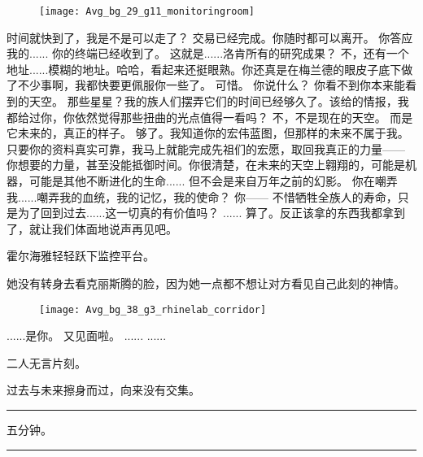 \documentclass[openany]{book}
\begin{document}
\begin{figure}[h]
    \centering
    \texttt{[image: Avg\_bg\_29\_g11\_monitoringroom]}
\end{figure}
\begin{dialogue}
     时间就快到了，我是不是可以走了？
     交易已经完成。你随时都可以离开。
     你答应我的......
     你的终端已经收到了。
     这就是......洛肯所有的研究成果？
     不，还有一个地址......模糊的地址。哈哈，看起来还挺眼熟。你还真是在梅兰德的眼皮子底下做了不少事啊，我都快要更佩服你一些了。
     可惜。
     你说什么？
     你看不到你本来能看到的天空。
     那些星星？我的族人们摆弄它们的时间已经够久了。该给的情报，我都给过你，你依然觉得那些扭曲的光点值得一看吗？
     不，不是现在的天空。
     而是它未来的，真正的样子。
     够了。我知道你的宏伟蓝图，但那样的未来不属于我。只要你的资料真实可靠，我马上就能完成先祖们的宏愿，取回我真正的力量——
     你想要的力量，甚至没能抵御时间。你很清楚，在未来的天空上翱翔的，可能是机器，可能是其他不断进化的生命......
     但不会是来自万年之前的幻影。
     你在嘲弄我......嘲弄我的血统，我的记忆，我的使命？
     你——
     不惜牺牲全族人的寿命，只是为了回到过去......这一切真的有价值吗？
     ......
     算了。反正该拿的东西我都拿到了，就让我们体面地说声再见吧。\par
    霍尔海雅轻轻跃下监控平台。\par
    她没有转身去看克丽斯腾的脸，因为她一点都不想让对方看见自己此刻的神情。
    \begin{figure}[h]
        \centering
        \texttt{[image: Avg\_bg\_38\_g3\_rhinelab\_corridor]}
    \end{figure}
     ......是你。
     又见面啦。
     ......
     ......
\end{dialogue}
\par
二人无言片刻。\par
过去与未来擦身而过，向来没有交集。
\par\noindent\rule{\textwidth}{0.4pt}
五分钟。
\par\noindent\rule{\textwidth}{0.4pt}
\end{document}
